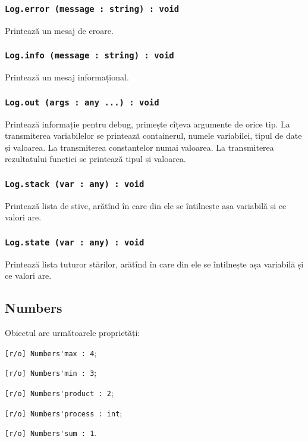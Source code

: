 \subsubsection{\lstinline|Log.error (message : string) : void|}

Printează un mesaj de eroare.

\subsubsection{\lstinline|Log.info (message : string) : void|}

Printează un mesaj informațional.

\subsubsection{\lstinline|Log.out (args : any ...) : void|}

Printează informație pentru debug, primește cîțeva argumente de orice tip. La transmiterea variabilelor se printează containerul, numele variabilei, tipul de date și valoarea. La transmiterea constantelor numai valoarea. La transmiterea rezultatului funcției se printează tipul și valoarea.

\subsubsection{\lstinline|Log.stack (var : any) : void|}

Printează lista de stive, arătînd în care din ele se întilnește așa variabilă și ce valori are.

\subsubsection{\lstinline|Log.state (var : any) : void|}

Printează lista tuturor stărilor, arătînd în care din ele se întilnește așa variabilă și ce valori are.

\subsection{{\color{orange} Numbers}}

Obiectul \numbers{} are următoarele proprietăți:
\begin{icItems}
	\item \lstinline|[r/o] Numbers'max : 4|;
	\item \lstinline|[r/o] Numbers'min : 3|;
	\item \lstinline|[r/o] Numbers'product : 2|;
	\item \lstinline|[r/o] Numbers'process : int|;
	\item \lstinline|[r/o] Numbers'sum : 1|.
\end{icItems}

